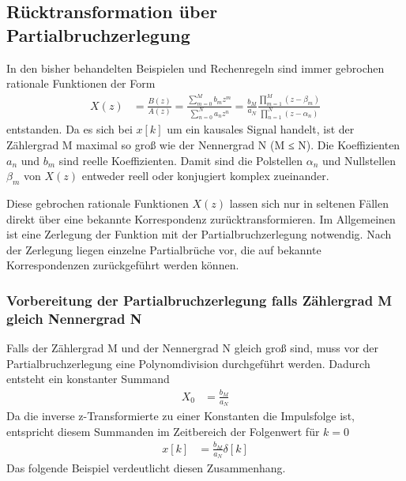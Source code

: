 \subsection{Rücktransformation über Partialbruchzerlegung}\label{sec:ruxfccktransformation-uxfcber-partialbruchzerlegung}

In den bisher behandelten Beispielen und Rechenregeln sind immer gebrochen rationale Funktionen der Form
\begin{align}
X(z) &= \frac{B(z)}{A(z)} = \frac{\sum\limits_{m = 0}^{M}{b_{m}  z^{m}}}{\sum\limits_{n = 0}^{N}{a_{n}  z^{n}}} = \frac{b_{M}}{a_{N}}  \frac{\prod\limits_{m = 1}^{M}\left( z - \beta_{m} \right)}{\prod\limits_{n = 1}^{N}\left( z - \alpha_{n} \right)} \label{eq:5.86}
\end{align}
entstanden. Da es sich bei \(x[k]\) um ein kausales Signal handelt, ist der Zählergrad M maximal so groß wie der Nennergrad N (M ≤ N). Die Koeffizienten \(a_{n}\) und \(b_{m}\) sind reelle Koeffizienten. Damit sind die Polstellen \(α_{n}\) und Nullstellen \(β_{m}\) von \(X(z)\) entweder reell oder konjugiert komplex zueinander.

Diese gebrochen rationale Funktionen \(X(z)\) lassen sich nur in seltenen Fällen direkt über eine bekannte Korrespondenz zurücktransformieren. Im Allgemeinen ist eine Zerlegung der Funktion mit der Partialbruchzerlegung notwendig. Nach der Zerlegung liegen einzelne Partialbrüche vor, die auf bekannte Korrespondenzen zurückgeführt werden können.

\subsubsection{Vorbereitung der Partialbruchzerlegung falls Zählergrad M gleich Nennergrad N}\label{sec:vorbereitung-der-partialbruchzerlegung-falls-zuxe4hlergrad-m-gleich-nennergrad-n}

Falls der Zählergrad M und der Nennergrad N gleich groß sind, muss vor der Partialbruchzerlegung eine Polynomdivision durchgeführt werden. Dadurch entsteht ein konstanter Summand
\begin{align}
X_{0} &= \frac{b_{M}}{a_{N}} \label{eq:5.87}
\end{align}
Da die inverse z-Transformierte zu einer Konstanten die Impulsfolge ist, entspricht diesem Summanden im Zeitbereich der Folgenwert für \(k = 0\)
\begin{align}
x[ k] &= \frac{b_{M}}{a_{N}}  \delta[ k] \label{eq:5.88}
\end{align}
Das folgende Beispiel verdeutlicht diesen Zusammenhang.

